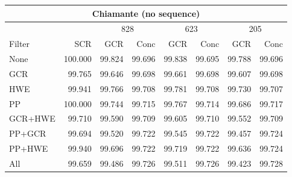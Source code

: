\begin{table}
\begin{center}
\begin{tabular}{|l|r|rr|rr|rr|}
\hline
\multicolumn{8}{|c|}{Chiamante (no sequence)}\\
\hline
&&\multicolumn{2}{c}{828}&\multicolumn{2}{|c}{623}&\multicolumn{2}{|c|}{205}\\
\hline
Filter & SCR & GCR & Conc & GCR & Conc & GCR & Conc \\ 
\hline
None & 100.000 & 99.824 & 99.696 & 99.838 & 99.695 & 99.788 & 99.696 \\ 
GCR & 99.765 & 99.646 & 99.698 & 99.661 & 99.698 & 99.607 & 99.698 \\ 
HWE & 99.941 & 99.766 & 99.708 & 99.781 & 99.708 & 99.730 & 99.707 \\ 
PP & 100.000 & 99.744 & 99.715 & 99.767 & 99.714 & 99.686 & 99.717 \\ 
\hline
GCR+HWE & 99.710 & 99.590 & 99.709 & 99.605 & 99.710 & 99.552 & 99.709 \\ 
PP+GCR & 99.694 & 99.520 & 99.722 & 99.545 & 99.722 & 99.457 & 99.724 \\ 
PP+HWE & 99.940 & 99.696 & 99.722 & 99.719 & 99.722 & 99.636 & 99.724 \\ 
\hline
All & 99.659 & 99.486 & 99.726 & 99.511 & 99.726 & 99.423 & 99.728 \\ 
\hline
\end{tabular}


\end{center}
\end{table}
